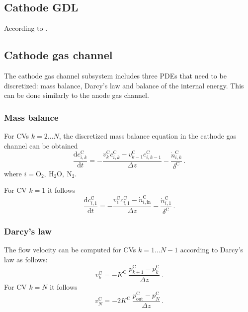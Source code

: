 \documentclass[pdftex,a4paper, 12pt]{article}
\begin{document}
\subsection{Cathode GDL}
%
According to \cite{Mangold2010}.
%
%
%
\subsection{Cathode gas channel}
%
The cathode gas channel subsystem includes three PDEs that need to be discretized: mass balance, Darcy's law and balance of the internal energy. This can be done similarly to the anode gas channel.
%
\subsubsection*{Mass balance}
%
%
For CVs $k=2 \dots N$, the discretized mass balance equation in the cathode gas channel can be obtained
%
%
\begin{equation}
	\frac{\mathrm{d} c_{i,k}^{\mathrm{C}}}{\mathrm{d} t} =-\frac{v_{k}^{\mathrm{C}} c_{i,k}^{\mathrm{C}} - v_{k-1}^{\mathrm{C}} c_{i,k-1}^{\mathrm{C}}}{\Delta z} - \frac{\dot{n}_{i,k}^{\mathrm{C}}}{\delta^{\mathrm{C}}} \, .
	\label{eq:mass_balC_disc}
\end{equation}
%
%
where $i = \mathrm{O_2}, ~\mathrm{H_2O}, ~\mathrm{N_2}$.
%
\par
%
For CV $k = 1$ it follows
%
\begin{equation}
	\frac{\mathrm{d} c_{i,1}^{\mathrm{C}}}{\mathrm{d} t} =-\frac{v_{1}^{\mathrm{C}} c_{i,1}^{\mathrm{C}} - \dot{n}_{i,\mathrm{in}}^{\mathrm{C}} }{\Delta z} - \frac{\dot{n}_{i,1}^{\mathrm{C}}}{\delta^{\mathrm{C}}} \, .
	\label{eq:mass_balC_disc1}
\end{equation}
%
%
%
\subsubsection*{Darcy's law}
%
%
%
The flow velocity can be computed for CVs $k=1 \dots N-1$ according to Darcy's law as follows:
%
\begin{equation}
	v_{k}^{\mathrm{C}} = -K^{\mathrm{C}} ~\frac{p_{k+1}^{\mathrm{C}} - p_{k}^{\mathrm{C}}}{\Delta z} \, .
	\label{eq:imp_balC_disc}
\end{equation}
%
For CV $k = N$ it follows
%
\begin{equation}
	v_{N}^{\mathrm{C}} = -2 K^{\mathrm{C}} ~\frac{p^{\mathrm{C}}_{\mathrm{out}} - p_{N}^{\mathrm{C}}}{\Delta z} \, .
	\label{eq:imp_balC_discN}
\end{equation}
%
%
\end{document}

